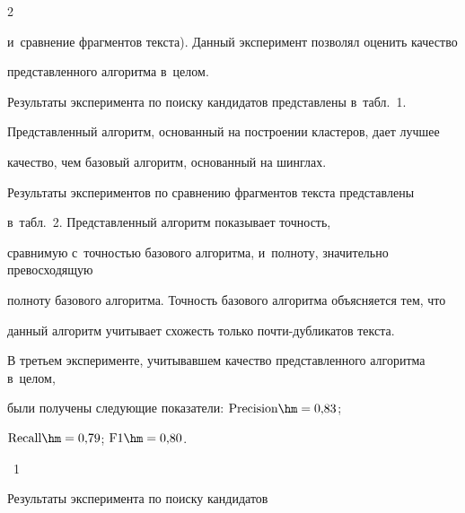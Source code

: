\begin{multicols}{2}
\begin{enumerate}
и~сравнение фрагментов текста). Данный эксперимент позволял оценить качество 


представленного алгоритма в~целом.


\end{enumerate}





Результаты эксперимента по поиску кандидатов представлены в~табл.~1.


Представленный алгоритм, основанный на построении кластеров, дает лучшее 


качество, чем базовый алгоритм, основанный на шинглах.











Результаты экспериментов по сравнению фрагментов текста представлены 


в~табл.~2. Пред\-став\-лен\-ный алгоритм показывает точ\-ность, 


сравнимую с~точностью базового алгоритма, и~полноту, значительно превосходящую 


полноту базового алгоритма. Точ\-ность базового алгоритма объясняется тем, что 


данный алгоритм учитывает схожесть только поч\-ти-дуб\-ли\-ка\-тов текста.














В третьем эксперименте, учитывавшем качество представленного алгоритма в~целом, 


были получены следующие показатели: $\mbox{Precision}\hm=0{,}83$; 


$\mbox{Recall}\hm=0{,}79$; $\mbox{F1}\hm=0{,}80$.







\begin{center}


\noindent


\parbox{138pt}{{{\tablename~1}\ \ \small{


Результаты эксперимента по поиску кандидатов


}}}






\end{center}
\end{multicols}
